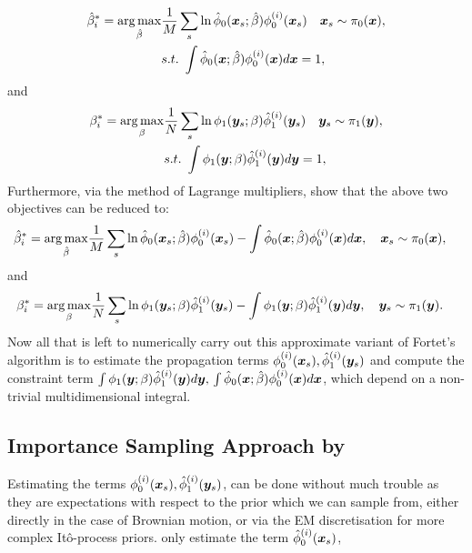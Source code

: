 \documentclass[a4paper,12pt,twoside,openright]{report}
\theoremstyle{definition}
\begin{document}
\begin{align}
    \hat{\beta}^*_i = \operatorname*{arg\,max}_{\hat{\beta} } &\frac{1}{M} \sum_s \operatorname{ln} {\hat{\phi}}_0({\bm{x}}_s; \hat{\beta} )   \phi_0^{(i)}({\bm{x}}_s)
    \quad {\bm{x}}_s\sim \pi_0({\bm{x}}), \nonumber \\
   & s.t. \text{ }  \int {\hat{\phi}}_0({\bm{x}}; \hat{\beta} )   \phi_0^{(i)}({\bm{x}}) d{\bm{x}} =1,
\end{align}
and
\begin{align}
    {\beta}^*_i = \operatorname*{arg\,max}_{{\beta} } &\frac{1}{N} \sum_s \operatorname{ln} \phi_1({\bm{y}}_s; {\beta} )   {\hat{\phi}}_1^{(i)}({\bm{y}}_s)
    \quad {\bm{y}}_s\sim \pi_1({\bm{y}}), \nonumber \\
   & s.t. \text{ }  \int \phi_1({\bm{y}}; {\beta} )   {\hat{\phi}}_1^{(i)}({\bm{y}}) d{\bm{y}} =1,
\end{align}
Furthermore, via the method of Lagrange multipliers, \cite{pavon2018data} show that the above two objectives can be reduced to:
\begin{align}
    \hat{\beta}^*_i = \operatorname*{arg\,max}_{\hat{\beta} } &\frac{1}{M} \sum_s \operatorname{ln} {\hat{\phi}}_0({\bm{x}}_s; \hat{\beta} )   \phi_0^{(i)}({\bm{x}}_s)- \int {\hat{\phi}}_0({\bm{x}}; \hat{\beta} )   \phi_0^{(i)}({\bm{x}}) d{\bm{x}} ,
    \quad {\bm{x}}_s\sim \pi_0({\bm{x}}) ,  \nonumber 
\end{align}
and
\begin{align}
    {\beta}^*_i = \operatorname*{arg\,max}_{{\beta} } &\frac{1}{N} \sum_s \operatorname{ln} \phi_1({\bm{y}}_s; {\beta} )   {\hat{\phi}}_1^{(i)}({\bm{y}}_s)- \int \phi_1({\bm{y}}; {\beta} )   {\hat{\phi}}_1^{(i)}({\bm{y}}) d{\bm{y}} ,
    \quad {\bm{y}}_s\sim \pi_1({\bm{y}}). \nonumber 
\end{align}
Now all that is left to numerically carry out this approximate variant of Fortet's algorithm is to estimate the propagation terms $ \phi_0^{(i)}({\bm{x}}_s), {\hat{\phi}}_1^{(i)}({\bm{y}}_s)$ and compute the constraint term $\int \phi_1({\bm{y}}; {\beta} )   {\hat{\phi}}_1^{(i)}({\bm{y}}) d{\bm{y}}, \, \int {\hat{\phi}}_0({\bm{x}}; \hat{\beta} )   \phi_0^{(i)}({\bm{x}}) d{\bm{x}}$, which depend on a non-trivial multidimensional integral.


\subsection{Importance Sampling Approach by \citet{pavon2018data} }

Estimating the terms $ \phi_0^{(i)}({\bm{x}}_s), {\hat{\phi}}_1^{(i)}({\bm{y}}_s)$, can be done without much trouble as they are expectations with respect to the prior which we can sample from, either directly in the case of Brownian motion, or via the EM discretisation for more complex Itô-process priors. \cite{pavon2018data} only estimate the term ${\hat{\phi}}_0^{(i)}({\bm{x}}_s)$,
\end{document}

